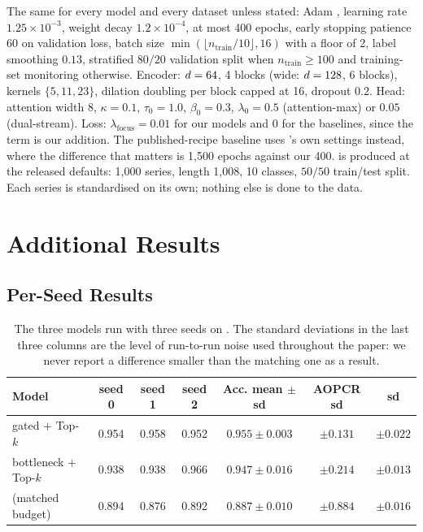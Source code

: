 The same for every model and every dataset unless stated: Adam \citep{kingma2015adam}, learning rate
$1.25\times10^{-3}$, weight decay $1.2\times10^{-4}$, at most 400 epochs, early stopping patience 60
on validation loss, batch size $\min(\lfloor n_{\mathrm{train}}/10 \rfloor, 16)$ with a floor of 2,
label smoothing $0.13$, stratified $80/20$ validation split when $n_{\mathrm{train}} \ge 100$ and
training-set monitoring otherwise. Encoder: $d = 64$, 4 blocks (wide: $d = 128$, 6
blocks), kernels $\{5, 11, 23\}$, dilation doubling per block capped at 16, dropout $0.2$. Head:
attention width 8, $\kappa = 0.1$, $\tau_0 = 1.0$, $\beta_0 = 0.3$, $\lambda_0 = 0.5$
(attention-max) or $0.05$ (dual-stream). Loss: $\lambda_{\mathrm{focus}} = 0.01$ for our models and
$0$ for the \millet{} baselines, since the term is our addition. The published-recipe baseline uses
\millet{}'s own settings instead, where the difference that matters is 1{,}500 epochs against our
400. \webtraffic{} is produced at the released defaults: 1{,}000 series, length 1{,}008, 10 classes,
$50/50$ train/test split. Each series is standardised on its own; nothing else is done to the data.

\section{Additional Results}

\subsection{Per-Seed Results}
\label{app:seeds}

\begin{table}[h]
\caption{The three models run with three seeds on \webtraffic{}. The standard deviations in the last
three columns are the level of run-to-run noise used throughout the paper: we never report a
difference smaller than the matching one as a result.}
\label{tab:app_seeds}
\begin{center}
\footnotesize
\setlength{\tabcolsep}{5pt}
\begin{tabular}{lcccccc}
\toprule
\textbf{Model} & seed 0 & seed 1 & seed 2 & Acc. mean $\pm$ sd & AOPCR sd & \ndcg{} sd \\
\midrule
\seanet{} gated $+$ Top-$k$      & 0.954 & 0.958 & 0.952 & $0.955 \pm 0.003$ & $\pm 0.131$ & $\pm 0.022$ \\
\seanet{} bottleneck $+$ Top-$k$ & 0.938 & 0.938 & 0.966 & $0.947 \pm 0.016$ & $\pm 0.214$ & $\pm 0.013$ \\
\millet{} (matched budget)       & 0.894 & 0.876 & 0.892 & $0.887 \pm 0.010$ & $\pm 0.884$ & $\pm 0.016$ \\
\bottomrule
\end{tabular}
\end{center}
\end{table}

